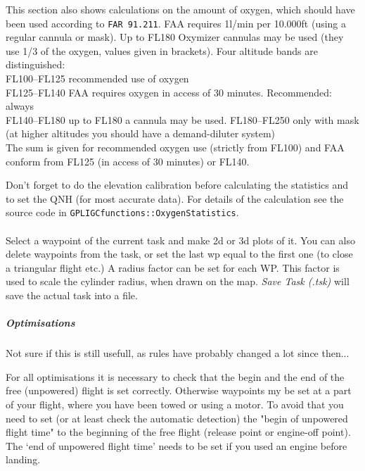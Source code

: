 This section also shows calculations on the amount of oxygen, which should have been used according to \texttt{FAR 91.211}.
FAA requires 1l/min per 10.000ft (using a regular cannula or mask). Up to FL180 Oxymizer cannulas may be used (they use 1/3 of the oxygen, values given in brackets).
Four altitude bands are distinguished: \\
FL100--FL125 recommended use of oxygen\\
FL125--FL140 FAA requires oxygen in access of 30 minutes. Recommended: always \\
FL140--FL180 up to FL180 a cannula may be used.
FL180--FL250 only with mask (at higher altitudes you should have a demand-diluter system)\\

The sum is given for recommended oxygen use (strictly from FL100) and FAA conform from FL125 (in access of 30 minutes) or FL140.

Don't forget to do the elevation calibration before calculating the statistics and to set the QNH (for most accurate data).
For details of the calculation see the source code in \texttt{GPLIGCfunctions::OxygenStatistics}.


\paragraph{
}
Select a waypoint of the current task and make 2d or 3d plots of it.
You can also delete waypoints from the task, or set the last wp equal to the first
one (to close a triangular flight etc.)
A radius factor can be set for each WP. This factor is used to scale the cylinder radius, when drawn on the map.
\emph{Save Task (.tsk)} will save the actual task into a file.


\subparagraph{Optimisations} \label{optimise} 
Not sure if this is still usefull, as rules have probably changed a lot since then...

For all optimisations it is necessary to check that the begin and the end of the free (unpowered) flight is set correctly.
Otherwise waypoints my be set at a part of your flight, where you have been towed or using a motor.
To avoid that you need to set (or at least check the automatic detection) the "begin of unpowered flight time" to the beginning of the free flight (release point or engine-off point). The `end of unpowered flight time' needs to be set if you used an engine before landing.

